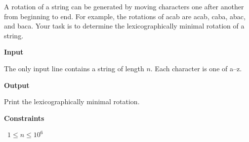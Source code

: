 A rotation of a string can be generated by moving characters one after another from beginning to end. For example, the rotations of acab are acab, caba, abac, and baca.
Your task is to determine the lexicographically minimal rotation of a string.

\vspace{0.3cm}\noindent\textbf{Input}

The only input line contains a string of length $n$. Each character is one of a–z.

\vspace{0.3cm}\noindent\textbf{Output}

Print the lexicographically minimal rotation.

\vspace{0.3cm}\noindent\textbf{Constraints}

\textbullet\ $1 \le n \le 10^6$